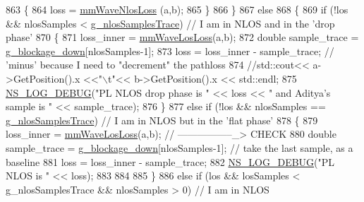 \begin{DoxyCode}
863                         \{               
864                                 loss = \hyperlink{classns3_1_1BuildingsObstaclePropagationLossModel_a165f29adb5af1840a7cbb837dcd8e5c9}{mmWaveNlosLoss} (a,b);
865                         \}
866                 \}
867                 \textcolor{keywordflow}{else}
868                 \{
869                         \textcolor{keywordflow}{if} (!los && nlosSamples < \hyperlink{namespacens3_aa27c343924716ad4dac244babcba8297}{g\_nlosSamplesTrace}) \textcolor{comment}{// I am in NLOS and
       in the 'drop phase'}
870                         \{
871                                 loss\_inner = \hyperlink{classns3_1_1BuildingsObstaclePropagationLossModel_ad689fe28aa4e050953598741fa1a627c}{mmWaveLosLoss}(a,b);
872                                 \textcolor{keywordtype}{double} sample\_trace = \hyperlink{namespacens3_a4ae83141c9a523e62203af4224f71b26}{g\_blockage\_down}[nlosSamples-1];
873                                 loss = loss\_inner - sample\_trace; \textcolor{comment}{// 'minus' because I need to "decrement"
       the pathloss}
874                                 \textcolor{comment}{//std::cout<< a->GetPosition().x <<"\(\backslash\)t"<< b->GetPosition().x << std::endl;}
875                                 \hyperlink{group__logging_ga413f1886406d49f59a6a0a89b77b4d0a}{NS\_LOG\_DEBUG}(\textcolor{stringliteral}{"PL NLOS drop phase is "} << loss << \textcolor{stringliteral}{" and Aditya's
       sample is "} << sample\_trace);
876                         \}
877                         \textcolor{keywordflow}{else} \textcolor{keywordflow}{if} (!los && nlosSamples == \hyperlink{namespacens3_aa27c343924716ad4dac244babcba8297}{g\_nlosSamplesTrace}) \textcolor{comment}{// I am in
       NLOS but in the 'flat phase'}
878                         \{
879                                 loss\_inner = \hyperlink{classns3_1_1BuildingsObstaclePropagationLossModel_ad689fe28aa4e050953598741fa1a627c}{mmWaveLosLoss}(a,b); \textcolor{comment}{// -----------------\_> CHECK}
880                                 \textcolor{keywordtype}{double} sample\_trace = \hyperlink{namespacens3_a4ae83141c9a523e62203af4224f71b26}{g\_blockage\_down}[nlosSamples-1]; \textcolor{comment}{//
       take the last sample, as a baseline}
881                                 loss = loss\_inner - sample\_trace;
882                                 \hyperlink{group__logging_ga413f1886406d49f59a6a0a89b77b4d0a}{NS\_LOG\_DEBUG}(\textcolor{stringliteral}{"PL NLOS is "} << loss);
883 
884                                 
885                         \}
886                         \textcolor{keywordflow}{else} \textcolor{keywordflow}{if} (los && losSamples < g\_nlosSamplesTrace && nlosSamples > 0) \textcolor{comment}{// I am in NLOS
}
\end{DoxyCode}
